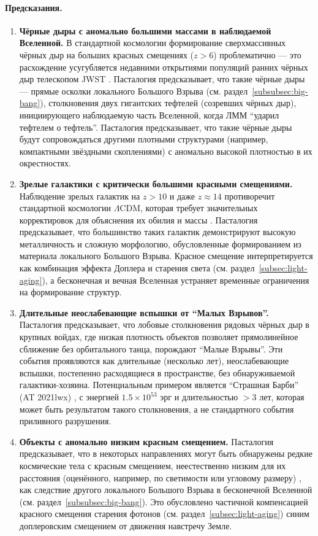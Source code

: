 \documentclass[pdflatex,sn-mathphys-num,referee]{sn-jnl}
\begin{document}
\paragraph{Предсказания.}
\begin{enumerate}
    \item \textbf{Чёрные дыры с аномально большими массами в наблюдаемой Вселенной.} В стандартной космологии формирование сверхмассивных чёрных дыр на больших красных смещениях (\( z > 6 \)) проблематично \cite{larson2023-jwst-bh} --- это расхождение усугубляется недавними открытиями популяций ранних чёрных дыр телескопом JWST \cite{maiolino2024-jades-bh}. Пасталогия предсказывает, что такие чёрные дыры --- прямые осколки локального Большого Взрыва (см. раздел~\ref{subsubsec:big-bang}), столкновения двух гигантских тефтелей (созревших чёрных дыр), инициирующего наблюдаемую часть Вселенной, когда ЛММ ``ударил тефтелем о тефтель''. Пасталогия предсказывает, что такие чёрные дыры будут сопровождаться другими плотными структурами (например, компактными звёздными скоплениями) с аномально высокой плотностью в их окрестностях.
    \item \textbf{Зрелые галактики с критически большими красными смещениями.} Наблюдение зрелых галактик на \( z > 10 \) \cite{labbe2023-jwst-galaxies} и даже \( z \approx 14 \) \cite{carniani2024-z14} противоречит стандартной космологии \(\Lambda\)CDM, которая требует значительных корректировок для объяснения их обилия и массы \cite{lu2024-jwst-lcdm-tension}. Пасталогия предсказывает, что большинство таких галактик демонстрируют высокую металличность и сложную морфологию, обусловленные формированием из материала локального Большого Взрыва. Красное смещение интерпретируется как комбинация эффекта Доплера и старения света (см. раздел~\ref{subsec:light-aging}), а бесконечная и вечная Вселенная устраняет временные ограничения на формирование структур.
    \item \textbf{Длительные неослабевающие вспышки от ``Малых Взрывов''.} Пасталогия предсказывает, что лобовые столкновения рядовых чёрных дыр в крупных войдах, где низкая плотность объектов позволяет прямолинейное сближение без орбитального танца, порождают ``Малые Взрывы''. Эти события проявляются как длительные (несколько лет), неослабевающие вспышки, постепенно расходящиеся в пространстве, без обнаруживаемой галактики-хозяина. Потенциальным примером является ``Страшная Барби'' (AT 2021lwx) \cite{subrayan2023-barbie}, с энергией \( 1.5 × 10^{53} \) эрг и длительностью \( >3 \) лет, которая может быть результатом такого столкновения, а не стандартного события приливного разрушения.
    \item \textbf{Объекты с аномально низким красным смещением.} Пасталогия предсказывает, что в некоторых направлениях могут быть обнаружены редкие космические тела с красным смещением, неестественно низким для их расстояния (оценённого, например, по светимости или угловому размеру) \cite{arp1987-quasars}, как следствие другого локального Большого Взрыва в бесконечной Вселенной (см. раздел~\ref{subsubsec:big-bang}). Это обусловлено частичной компенсацией красного смещения старения фотонов (см. раздел~\ref{subsec:light-aging}) синим доплеровским смещением от движения навстречу Земле.
\end{enumerate}
 
\end{document}
